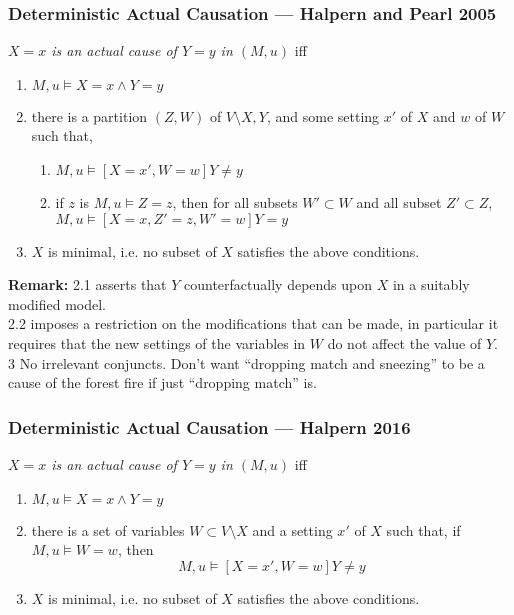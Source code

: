 \documentclass[UTF8,11pt,colorlinks,compress,openany]{beamer}%
\begin{document}
\begin{frame}\frametitle{Deterministic Actual Causation --- Halpern and Pearl 2005}
\begin{definition}
\emph{$X=x$ is an actual cause of $Y=y$ in $(M,u)$} iff
\begin{enumerate}
	\item $M,u\vDash X=x\wedge Y=y$
	\item there is a partition $(Z,W)$ of $V\setminus X,Y$, and some setting $x'$ of $X$ and $w$ of $W$ such that,
	\begin{enumerate}
		\item $M,u\vDash [X=x',W=w]Y\ne y$
		\item if $z$ is $M,u\vDash Z=z$, then for all subsets $W'\subset W$ and all subset $Z'\subset Z$, $M,u\vDash[X=x,Z'=z,W'=w]Y=y$
	\end{enumerate}
	\item $X$ is minimal, i.e. no subset of $X$ satisfies the above conditions.
\end{enumerate}
\end{definition}
\textbf{Remark:} 2.1 asserts that $Y$ counterfactually depends upon $X$ in a suitably modified model.\\
2.2 imposes a restriction on the modifications that can be made, in particular it requires that the new settings of the variables in $W$ do not affect the value of $Y$.\\
3 No irrelevant conjuncts. Don't want ``dropping match and sneezing'' to be a cause of the forest fire if just ``dropping match'' is.
\end{frame}

\begin{frame}\frametitle{Deterministic Actual Causation --- Halpern 2016}
\begin{definition}
\emph{$X=x$ is an actual cause of $Y=y$ in $(M,u)$} iff
\begin{enumerate}
	\item $M,u\vDash X=x\wedge Y=y$
	\item there is a set of variables $W\subset V\setminus X$ and a setting $x'$ of $X$ such that, if $M,u\vDash W=w$, then
	\[M,u\vDash [X=x',W=w]Y\ne y\]
	\item $X$ is minimal, i.e. no subset of $X$ satisfies the above conditions.
\end{enumerate}
\end{definition}
\end{frame}
\end{document}
